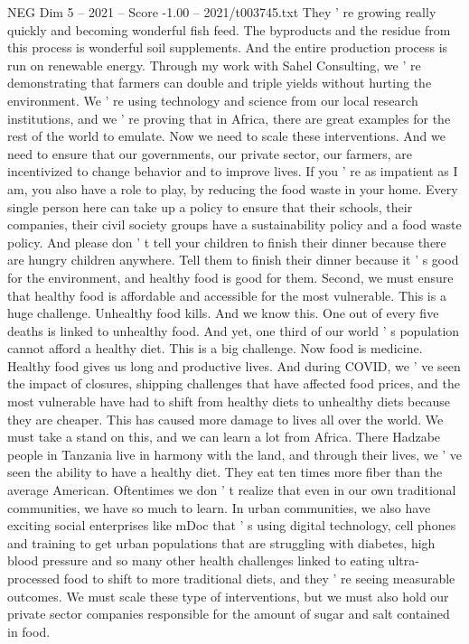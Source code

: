 \begin{textsample}{NEG Dim 5 – 2021 – Score -1.00 – 2021/t003745.txt}
They ' re growing really quickly and becoming wonderful fish feed.
The byproducts and the residue from this process is wonderful soil supplements.
And the entire production process is run on renewable energy.
Through my work with Sahel Consulting, we ' re demonstrating that farmers can double and triple yields without hurting the environment.
We ' re using technology and science from our local research institutions, and we ' re proving that in Africa, there are great examples for the rest of the world to emulate.
Now we need to scale these interventions.
And we need to ensure that our governments, our private sector, our farmers, are incentivized to change behavior and to improve lives.
If you ' re as impatient as I am, you also have a role to play, by reducing the food waste in your home.
Every single person here can take up a policy to ensure that their schools, their companies, their civil society groups have a sustainability policy and a food waste policy.
And please don ' t tell your children to finish their dinner because there are hungry children anywhere.
Tell them to finish their dinner because it ' s good for the environment, and healthy food is good for them.
Second, we must ensure that healthy food is affordable and accessible for the most vulnerable.
This is a huge challenge.
Unhealthy food kills.
And we know this.
One out of every five deaths is linked to unhealthy food.
And yet, one third of our world ' s population cannot afford a healthy diet.
This is a big challenge.
Now food is medicine.
Healthy food gives us long and productive lives.
And during COVID, we ' ve seen the impact of closures, shipping challenges that have affected food prices, and the most vulnerable have had to shift from healthy diets to unhealthy diets because they are cheaper.
This has caused more damage to lives all over the world.
We must take a stand on this, and we can learn a lot from Africa.
There Hadzabe people in Tanzania live in harmony with the land, and through their lives, we ' ve seen the ability to have a healthy diet.
They eat ten times more fiber than the average American.
Oftentimes we don ' t realize that even in our own traditional communities, we have so much to learn.
In urban communities, we also have exciting social enterprises like mDoc that ' s using digital technology, cell phones and training to get urban populations that are struggling with diabetes, high blood pressure and so many other health challenges linked to eating ultra-processed food to shift to more traditional diets, and they ' re seeing measurable outcomes.
We must scale these type of interventions, but we must also hold our private sector companies responsible for the amount of sugar and salt contained in food.

\end{textsample}
